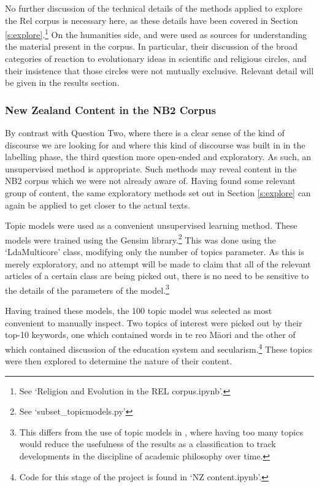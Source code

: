 \documentclass{article}
\begin{document}
No further discussion of the technical details of the methods applied to explore the Rel corpus is necessary here, as these details have been covered in Section \ref{s:explore}.\footnote{See `Religion and Evolution in the REL corpus.ipynb'.} On the humanities side, \cite{dupree} and \cite{gregory} were used as sources for understanding the material present in the corpus. In particular, their discussion of the broad categories of reaction to evolutionary ideas in scientific and religious circles, and their insistence that those circles were not mutually exclusive. Relevant detail will be given in the results section.

\subsubsection{New Zealand Content in the NB2 Corpus}

By contrast with Question Two, where there is a clear sense of the kind of discourse we are looking for and where this kind of discourse was built in in the labelling phase, the third question more open-ended and exploratory. As such, an unsupervised method is appropriate. Such methods may reveal content in the NB2 corpus which we were not already aware of. Having found some relevant group of content, the same exploratory methods set out in Section \ref{s:explore} can again be applied to get closer to the actual texts.

Topic models were used as a convenient unsupervised learning method. These  models were trained using the Gensim library.\footnote{See `subset\_\-topicmodels.py'} This was done using the `LdaMulticore' class, modifying only the number of topics parameter. As this is merely exploratory, and no attempt will be made to claim that all of the relevant articles of a certain class are being picked out, there is no need to be sensitive to the details of the parameters of the model.\footnote{This differs from the use of topic models in \cite{weatherson}, where having too many topics would reduce the usefulness of the results as a classification to track developments in the discipline of academic philosophy over time.}

Having trained these models, the 100 topic model was selected as most convenient to manually inspect. Two topics of interest were picked out by their top-10 keywords, one which contained words in te reo Māori and the other of which contained discussion of the education system and secularism.\footnote{Code for this stage of the project is found in `NZ content.ipynb'.} These topics were then explored to determine the nature of their content.
\end{document}
